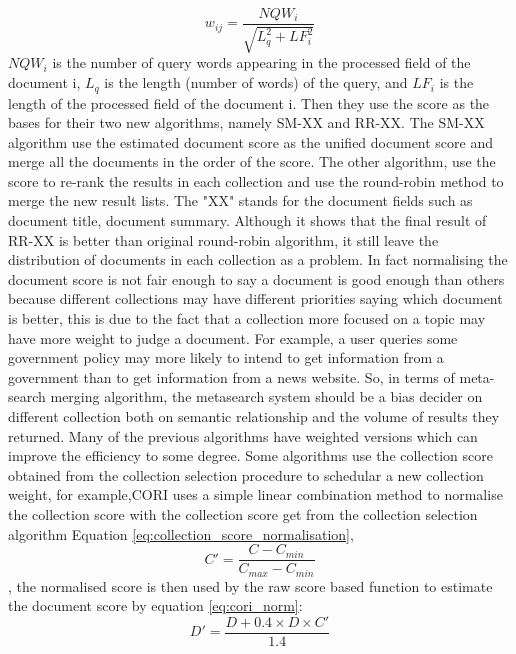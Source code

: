  \begin{equation}
 \label{eq:dscore} 
 w_{ij}=\frac{NQW_i}{\sqrt{L_q^2+LF_i^2}} 
 \end{equation} 
 $NQW_i$ is the number of
query words appearing in the processed field of the document i, $L_q$ is the length (number of words) of the query, and $LF_i$ is the length of the processed field of the document i. Then they use the score as the bases for their two new algorithms, namely SM-XX and RR-XX. The SM-XX algorithm use the estimated document score as the unified document score and merge all the documents in the order of the score. The other algorithm, use the score to re-rank the results in each collection and use the round-robin method to merge the new result lists. The "XX" stands for the document fields such as document title, document summary. Although it shows that the final result of RR-XX is better than original round-robin algorithm, it still leave the distribution of documents in each collection as a problem.
In fact normalising the document score is not fair enough to say a document is good enough than others because different collections may have different priorities saying which document is better, this is due to the fact that a collection more focused on a topic may have more weight to judge a document. For example, a user queries some government policy may more likely to intend to get information from a government than to get information from a news website. So, in terms of meta-search merging algorithm, the metasearch system should be a bias decider on different collection both on semantic relationship and the volume of results they returned. Many of the previous algorithms have weighted versions which can improve the efficiency to some degree. Some algorithms use the collection score obtained from the collection selection procedure to schedular a new collection weight, for example,CORI\cite{Callan2000,Callan1995} uses a simple linear combination method to normalise the collection score with the collection score get from the collection selection algorithm Equation \eqref{eq:collection_score_normalisation}, 
\begin{equation} 
\label{eq:collection_score_normalisation}
 	C'=\frac{C-C_{min}}{C_{max}-C_{min}}
\end{equation} , 
the normalised score is then used by the raw score based function to estimate the document score by equation \eqref{eq:cori_norm}: 
\begin{equation}
\label{eq:cori_norm}
	 D'=\frac{D+0.4\times{D}\times{C'}}{1.4}
\end{equation} 
